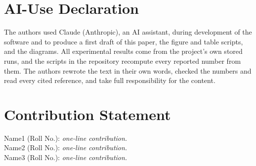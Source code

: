 \documentclass[12pt,onecolumn,draftclsnofoot]{IEEEtran}
\begin{document}
\section*{AI-Use Declaration}
The authors used Claude (Anthropic), an AI assistant, during development of the software and to produce a first draft of this paper, the figure and table scripts, and the diagrams. All experimental results come from the project's own stored runs, and the scripts in the repository recompute every reported number from them. The authors rewrote the text in their own words, checked the numbers and read every cited reference, and take full responsibility for the content.

\section*{Contribution Statement}
\noindent Name1 (Roll No.): \emph{one-line contribution.}\\
Name2 (Roll No.): \emph{one-line contribution.}\\
Name3 (Roll No.): \emph{one-line contribution.}



\end{document}
